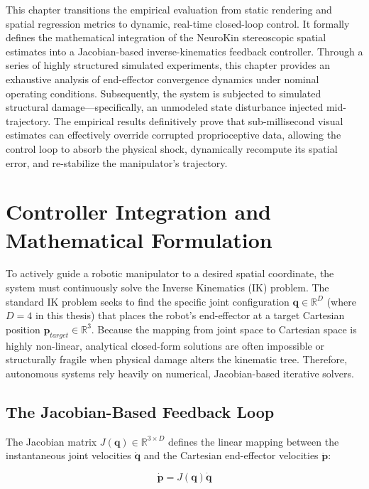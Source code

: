 \documentclass[12pt,a4paper,oneside]{report}
\begin{document}
This chapter transitions the empirical evaluation from static rendering and spatial regression metrics to dynamic, real-time closed-loop control. It formally defines the mathematical integration of the NeuroKin stereoscopic spatial estimates into a Jacobian-based inverse-kinematics feedback controller. Through a series of highly structured simulated experiments, this chapter provides an exhaustive analysis of end-effector convergence dynamics under nominal operating conditions. Subsequently, the system is subjected to simulated structural damage—specifically, an unmodeled state disturbance injected mid-trajectory. The empirical results definitively prove that sub-millisecond visual estimates can effectively override corrupted proprioceptive data, allowing the control loop to absorb the physical shock, dynamically recompute its spatial error, and re-stabilize the manipulator's trajectory.

\section{Controller Integration and Mathematical Formulation}

To actively guide a robotic manipulator to a desired spatial coordinate, the system must continuously solve the Inverse Kinematics (IK) problem. The standard IK problem seeks to find the specific joint configuration $\mathbf{q} \in \mathbb{R}^D$ (where $D=4$ in this thesis) that places the robot's end-effector at a target Cartesian position $\mathbf{p}_{target} \in \mathbb{R}^3$. Because the mapping from joint space to Cartesian space is highly non-linear, analytical closed-form solutions are often impossible or structurally fragile when physical damage alters the kinematic tree. Therefore, autonomous systems rely heavily on numerical, Jacobian-based iterative solvers.

\subsection{The Jacobian-Based Feedback Loop}

The Jacobian matrix $J(\mathbf{q}) \in \mathbb{R}^{3 \times D}$ defines the linear mapping between the instantaneous joint velocities $\dot{\mathbf{q}}$ and the Cartesian end-effector velocities $\dot{\mathbf{p}}$:

\begin{equation}
\dot{\mathbf{p}} = J(\mathbf{q}) \dot{\mathbf{q}}
\end{equation}
\end{document}
